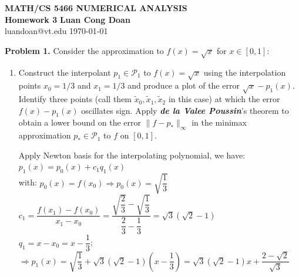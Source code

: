 \documentclass[14pt,a4paper]{article}
\begin{document}
\label{cover}
\begin{center}
	\vspace*{3cm}
	\large{\textbf{MATH/CS 5466 NUMERICAL ANALYSIS \\ Homework 3}}
	\vfill
	\textbf{Luan Cong Doan} \\ luandoan@vt.edu
	\vfill
	\today
\end{center}
\pagebreak

\label{Answer Sheet - Numerical Homework 3}
\doublespacing

\label{Problem 1}
\large\textbf{Problem 1.} Consider the approximation to $f(x) = \sqrt{x}$ for $x \in [0,1]$:
\begin{enumerate}
	\label{1a}
	\item Construct the interpolant $p_1 \in \mathcal{P}_1$ to $f(x)= \sqrt{x}$ using the interpolation points $x_0 = 1/3$ and $x_1 = 1/3$ and produce a plot of the error $\sqrt{x} -p_1(x)$. Identify three points (call them $\tilde{x}_0, \tilde{x}_1, \tilde{x}_2$ in this case) at which the error $f(x) - p_1(x)$ oscillates sign. Apply \textbf{\textit{de la Valee Poussin}}'s theorem to obtain a lower bound on the error $\|f-p_*\|_{\infty}$ in the minimax approximation $p_* \in \mathcal{P}_1$ to $f$ on $[0,1]$.
	
	
	Apply Newton basis for the interpolating polynomial, we have:\\
	\hspace*{2cm} $p_1(x) = p_0(x) + c_1q_1(x)$\\
	with: $p_0(x)= f(x_0) \Rightarrow p_0(x) = \sqrt{\dfrac{1}{3}}$ \\
	\hspace*{1.1cm} $c_1 = \dfrac{f(x_1) - f(x_0)}{x_1 - x_0} = \dfrac{\sqrt{\dfrac{2}{3}} - \sqrt{\dfrac{1}{3}}}{\dfrac{2}{3} - \dfrac{1}{3}} = \sqrt{3}(\sqrt{2} -1)$\\
	\hspace*{1.1cm} $ q_1 = x - x_0 = x - \dfrac{1}{3}$;\\
	$ \Rightarrow p_1(x)= \sqrt{\dfrac{1}{3}} + \sqrt{3}(\sqrt{2} -1)(x - \dfrac{1}{3}) = \sqrt{3}(\sqrt{2} -1)x + \dfrac{2 - \sqrt{2}}{\sqrt{3}}$\\
	

\end{enumerate}
\end{document}

